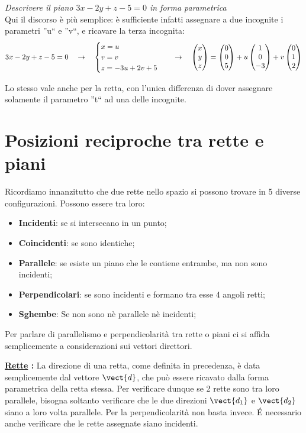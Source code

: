 \begin{esempio}
\emph{Descrivere il piano $3x-2y+z-5=0$ in forma parametrica}\\[5pt]
Qui il discorso è più semplice: è sufficiente infatti assegnare a due incognite i parametri ''u`` e ''v``, e ricavare la terza incognita:
\[3x-2y+z-5=0 \quad \rightarrow \quad \begin{cases}
x = u \\
v = v \\
z = -3u+2v+5
\end{cases} \quad \rightarrow \quad \begin{pmatrix} x\\ y\\ z \end{pmatrix} =  \begin{pmatrix} 0\\ 0\\ 5 \end{pmatrix}+u \begin{pmatrix} 1\\ 0\\ -3 \end{pmatrix}+v \begin{pmatrix} 0\\ 1\\ 2 \end{pmatrix} \]
\end{esempio}
Lo stesso vale anche per la retta, con l'unica differenza di dover assegnare solamente il parametro ''t`` ad una delle incognite.

\section{Posizioni reciproche tra rette e piani}

Ricordiamo innanzitutto che due rette nello spazio si possono trovare in 5 diverse configurazioni. Possono essere tra loro:
\begin{itemize}
\item \textbf{Incidenti}: se si intersecano in un punto;
\item \textbf{Coincidenti}: se sono identiche;
\item \textbf{Parallele}: se esiste un piano che le contiene entrambe, ma non sono incidenti;
\item \textbf{Perpendicolari}: se sono incidenti e formano tra esse 4 angoli retti;
\item \textbf{Sghembe}: Se non sono nè parallele nè incidenti;
\end{itemize}

\vspace{7pt}

Per parlare di parallelismo e perpendicolarità tra rette o piani ci si affida semplicemente a considerazioni sui vettori direttori. 

\vspace{7pt}

\textbf{\underline{Rette} :} \;La direzione di una retta, come definita in precedenza, è data semplicemente dal vettore $\vect{d}$, che può essere ricavato dalla forma parametrica della retta stessa. Per verificare dunque se 2 rette sono tra loro parallele, bisogna soltanto verificare che le due direzioni $\vect{d_1}$ e $\vect{d_2}$ siano a loro volta parallele. Per la perpendicolarità non basta invece. \'E necessario anche verificare che le rette assegnate siano incidenti.

